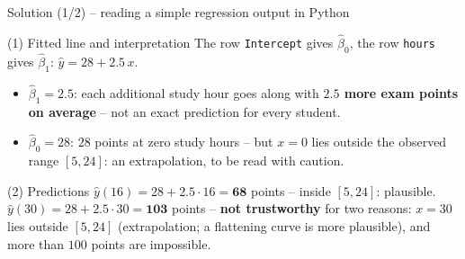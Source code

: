 \documentclass[aspectratio=169,11pt]{beamer}
\begin{document}
\begin{frame}{Solution (1/2) -- reading a simple regression output in Python}
  \begin{exampleblock}{(1) Fitted line and interpretation}
    The row \texttt{Intercept} gives $\hat\beta_0$, the row \texttt{hours}
    gives $\hat\beta_1$: \quad $\hat y = 28 + 2.5\,x$.
    \begin{itemize}
      \item $\hat\beta_1=2.5$: each additional study hour goes along with
            \textbf{$2.5$ more exam points on average} -- not an exact
            prediction for every student.
      \item $\hat\beta_0=28$: $28$ points at zero study hours -- but $x=0$ lies
            outside the observed range $[5,24]$: an extrapolation, to be read
            with caution.
    \end{itemize}
  \end{exampleblock}
  \begin{exampleblock}{(2) Predictions}
    $\hat y(16)=28+2.5\cdot16=\mathbf{68}$ points -- inside $[5,24]$: plausible.\\
    $\hat y(30)=28+2.5\cdot30=\mathbf{103}$ points -- \textbf{not trustworthy}
    for two reasons: $x=30$ lies outside $[5,24]$ (extrapolation; a
    flattening curve is more plausible), and more than $100$ points are
    impossible.
  \end{exampleblock}
\end{frame}
\end{document}
